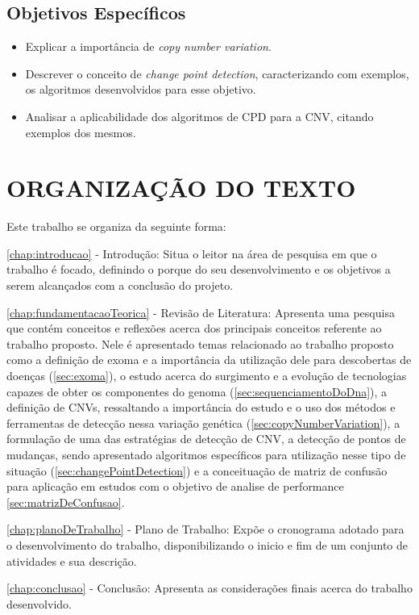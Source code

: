 \subsection{Objetivos Específicos}
	
\begin{itemize}
    \item Explicar a importância de \textit{copy number variation}.
    \item Descrever o conceito de \textit{change point detection}, caracterizando com exemplos, os algoritmos desenvolvidos para esse objetivo.
    \item Analisar a aplicabilidade dos algoritmos de CPD para a CNV, citando exemplos dos mesmos.
\end{itemize}

\section{ORGANIZAÇÃO DO TEXTO}

Este trabalho se organiza da seguinte forma:

\autoref{chap:introducao} - Introdução: Situa o leitor na área de pesquisa em que o trabalho é focado, definindo o porque do seu desenvolvimento e os objetivos a serem alcançados com a conclusão do projeto.

\autoref{chap:fundamentacaoTeorica} - Revisão de Literatura: Apresenta uma pesquisa que contém conceitos e reflexões acerca dos principais conceitos referente ao trabalho proposto. Nele é apresentado temas relacionado ao trabalho proposto como a definição de exoma e a importância da utilização dele para descobertas de doenças (\autoref{sec:exoma}), o estudo acerca do surgimento e a evolução de tecnologias capazes de obter os componentes do genoma (\autoref{sec:sequenciamentoDoDna}), a definição de CNVs, ressaltando a importância do estudo e o uso dos métodos e ferramentas de detecção nessa variação genética (\autoref{sec:copyNumberVariation}), a formulação de uma das estratégias de detecção de CNV, a detecção de pontos de mudanças, sendo apresentado algoritmos específicos para utilização nesse tipo de situação (\autoref{sec:changePointDetection}) e a conceituação de matriz de confusão para aplicação em estudos com o objetivo de analise de performance \autoref{sec:matrizDeConfusao}.

\autoref{chap:planoDeTrabalho} - Plano de Trabalho: Expõe o cronograma adotado para o desenvolvimento do trabalho, disponibilizando o inicio e fim de um conjunto de atividades e sua descrição.

\autoref{chap:conclusao} - Conclusão: Apresenta as considerações finais acerca do trabalho desenvolvido.